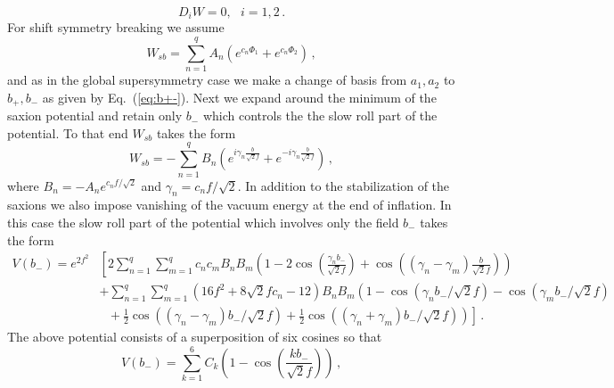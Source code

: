 \documentclass[12pt]{article}
\begin{document}
\begin{equation}
  D_i W = 0,
  ~~~ i = 1, 2\,.
\end{equation}
For shift symmetry breaking we assume
\begin{equation}
  W_{sb} = \sum_{n = 1}^q A_n \left(e^{c_n \Phi_1} + e^{c_n \Phi_2}\right)\,,
\end{equation}
and as in the global supersymmetry case we make a change of basis from $a_1, a_2$ to $b_+, b_-$ as given by Eq.~(\ref{eq:b+-}).
Next we expand around the minimum of the saxion potential and retain only $b_-$ which controls the the slow roll part of the potential.
To that end $W_{sb}$ takes the form
\begin{equation}
  W_{sb} = -\sum_{n = 1}^q B_n \left(
      e^{i \gamma_n \frac{b}{\sqrt{2} f}}
    + e^{-i \gamma_n \frac{b}{\sqrt{2} f}}
  \right)\,,
\end{equation}
where $B_n = -A_n e^{c_n f / \sqrt{2}}$ and $\gamma_n = c_n f / \sqrt{2}$.
In addition to the stabilization of the saxions we also impose vanishing of the vacuum energy at the end of inflation.
In this case the slow roll part of the potential which involves only the field $b_-$ takes the form
\begin{equation} \label{eq:supergravity:Vslow}
  \begin{aligned}
    V\left(b_-\right) = e^{2 f^2} &\left[
      2 \sum_{n = 1}^q \sum_{m = 1}^q c_n c_m B_n B_m \left(
          1
        - 2 \cos\left(\frac{\gamma_n b_-}{\sqrt{2} f}\right)
        + \cos\left(\left(\gamma_n - \gamma_m\right) \frac{b}{\sqrt{2} f}\right)
      \right)\right.\\
      & + \sum_{n = 1}^q \sum_{m = 1}^q \left(16 f^2 + 8 \sqrt{2} f c_n - 12\right) B_n B_m \left(
          1
        - \cos\left(\gamma_n b_- / \sqrt{2} f\right)
        - \cos\left(\gamma_m b_- / \sqrt{2} f\right)\right.\\
      & ~~~ \left.\left.{}
        + \frac{1}{2} \cos\left(\left(\gamma_n - \gamma_m\right) b_- / \sqrt{2} f\right)
        + \frac{1}{2} \cos\left(\left(\gamma_n + \gamma_m\right) b_- / \sqrt{2} f\right)
      \right)
    \right]\,.
  \end{aligned}
\end{equation}
The above potential consists of a superposition of six cosines so that
\begin{equation} \label{eq:supergravity:Vslow3}
  V\left(b_-\right)
    = \sum_{k = 1}^6 C_k \left(1 - \cos\left(\frac{k b_-}{\sqrt{2} f}\right)\right)\,,
\end{equation}
\end{document}
